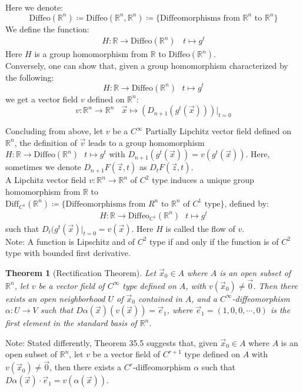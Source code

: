 \documentclass[15pt]{book}
\theoremstyle{break}
\theoremstyle{break}
\newtheorem{thm}{Theorem}[section]
\newcommand{\R}{\mathbb{R}}
\newcommand{\note}{\color{red}Note: \color{black}}
\begin{document}
Here we denote: 
$$\text{Diffeo}(\R^n)\coloneqq \text{Diffeo}(\R^n, \R^n) \coloneqq \{\text{Diffeomorphisms from }\R^n \text{ to }\R^n\}$$ 
We define the function:
\begin{align*}
H:\R \to \text{Diffeo}(\R^n) \ \ \ \ t\mapsto g^t
\end{align*}
Here $H$ is a group homomorphism from $\R$ to $\text{Diffeo}(\R^n)$.\\

Conversely, one can show that, given a group homomorphism characterized by the following: 
$$H: \R \to \text{Diffeo}(\R^n) \ \ \ t\mapsto g^t$$ 
we get a vector field $v$ defined on $\R^n$:
$$v:\R^n \to \R^n \ \ \ \ \vec{x}\mapsto\left( D_{n+1}(g^t(\vec{x}))\right)|_{t = 0}$$

Concluding from above, let $v$ be a $C^\infty$ Partially Lipchitz vector field defined on $\R^n$, the definition of $\vec{v}$ leads to a group homomorphism $H: \R \to \text{Diffeo}(\R^n) \ \ \ t\mapsto g^t$ with $D_{n+1}(g^t(\vec{x})) = v(g^t(\vec{x}))$. Here, sometimes we denote $D_{n+1}F(\vec{z},t)$ as $D_{t}F(\vec{z},t)$. \\

A Lipchitz vector field $v:\R^n \to \R^n$ of $C^2$ type induces a unique group homomorphism from $\R$ to $\text{Diff}_{C^1}(\R^n) \coloneqq \{\text{Diffeomorphisms from }R^n \text{ to }\R^n \text{ of }C^1 \text{ type}\}$, defined by:
\begin{align*}
H : \R \to \text{Diffeo}_{C^1}(\R^n) \ \ \ t\mapsto g^t
\end{align*}
such that $D_{t}(g^t(\vec{x})|_{t=0} = v(\vec{x})$. Here $H$ is called the flow of $v$.\\

\note A function is Lipschitz and of $C^2$ type if and only if the function is of $C^2$ type with bounded first derivative.


\begin{thm}[Rectification Theorem]
Let $\vec{x}_0 \in A$ where $A $ is an open subset of $\R^n$, let $v $ be a vector field of $C^\infty$ type defined on $A$, with $v(\vec{x}_0) \neq \vec{0}$. Then there exists an open neighborhood $U$ of $\vec{x}_0$ contained in $A$, and a $C^\infty$-diffeomorphism $\alpha:U\to V$ such that $D\alpha(\vec{x})(v(\vec{x})) = \vec{e}_1$, where $\vec{e}_1 = (1,0,0,\cdots, 0)$ is the first element in the standard basis of $\R^n$. 
\end{thm}

\note Stated differently, Theorem 35.5 suggests that, given $\vec{x}_0 \in A$ where $A$ is an open subset of $\R^n$, let $v $ be a vector field of $C^{r+1}$ type defined on $A$ with $v(\vec{x}_0) \neq \vec{0}$, then there exists a $C^r$-diffeomorphism $\alpha$ such that $D\alpha(\vec{x})\cdot \vec{e}_1 = v(\alpha(\vec{x}))$. 
\end{document}
